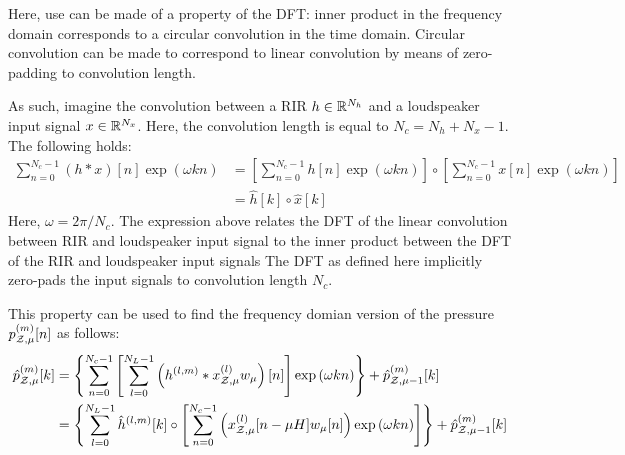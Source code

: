 Here, use can be made of a property of the DFT: inner product in the frequency domain corresponds to a circular convolution in the time domain.
Circular convolution can be made to correspond to linear convolution by means of zero-padding to convolution length.

As such, imagine the convolution between a RIR $h\in\mathbb{R}^{N_h}$ and a loudspeaker input signal $x\in\mathbb{R}^{N_x}$.
Here, the convolution length is equal to $N_c = N_h + N_x - 1$.
The following holds:
\begin{align}
    \sum_{n=0}^{N_c - 1} \left(h \ast x\right)[n]\exp{\left(\omega kn\right)}  &= \left[\sum_{n=0}^{N_c - 1} h[n]\exp{\left(\omega kn\right)}\right] \circ \left[\sum_{n=0}^{N_c - 1} x[n]\exp{\left(\omega kn\right)}\right] \\
    &= \hat{h}[k] \circ \hat{x}[k]
\end{align}
Here, $\omega = 2\pi / N_c$. 
The expression above relates the DFT of the linear convolution between RIR and loudspeaker input signal to the inner product between the DFT of the RIR and loudspeaker input signals
The DFT as defined here implicitly zero-pads the input signals to convolution length $N_c$.  

This property can be used to find the frequency domian version of the pressure $p_{\mathcal{Z},\mu}^{(m)}[n]$ as follows: 
\begin{align}
    \hat{p}_{\mathcal{Z},\mu}^{(m)}[k] &= \left\{\sum_{n=0}^{N_c - 1}\left[\sum_{l=0}^{N_L - 1} \left(h^{(l,m)} \ast x^{(l)}_{\mathcal{Z},\mu}w_\mu\right)[n]\right]\exp{\left(\omega kn\right)}\right\} + \hat{p}_{\mathcal{Z},\mu-1}^{(m)}[k] \\
                               &= \left\{\sum_{l=0}^{N_L - 1} \hat{h}^{(l,m)}[k] \circ \left[\sum_{n=0}^{N_c - 1} \left(x^{(l)}_{\mathcal{Z},\mu}[n - \mu H]w_\mu[n]\right)\exp{\left(\omega kn\right)}\right]\right\} + \hat{p}_{\mathcal{Z},\mu-1}^{(m)}[k] 
\end{align}

